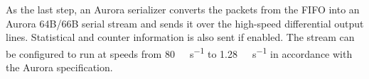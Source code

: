 As the last step, an Aurora serializer converts the packets from the FIFO into an Aurora 64B/66B serial stream and sends it over the high-speed differential output lines. Statistical and counter information is also sent if enabled. The stream can be configured to run at speeds from \SI{80}{\mega\bit\per\second} to \SI{1.28}{\giga\bit\per\second} in accordance with the Aurora specification.


